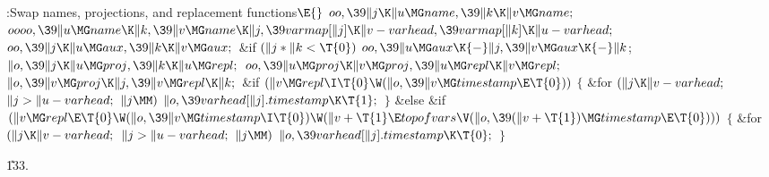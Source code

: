 \Y\B\4:Swap names, projections, and replacement functions\X${}\E{}$\6
$\\{oo},\39\|j\K\|u\MG\\{name},\39\|k\K\|v\MG\\{name};{}$\6
${}\\{oooo},\39\|u\MG\\{name}\K\|k,\39\|v\MG\\{name}\K\|j,\39\\{varmap}[\|j]\K%
\|v-\\{varhead},\39\\{varmap}[\|k]\K\|u-\\{varhead};{}$\6
${}\\{oo},\39\|j\K\|u\MG\\{aux},\39\|k\K\|v\MG\\{aux};{}$\6
\&{if} ${}(\|j*\|k<\T{0}){}$\1\5
${}\\{oo},\39\|u\MG\\{aux}\K{-}\|j,\39\|v\MG\\{aux}\K{-}\|k{}$;\2\6
${}\|o,\39\|j\K\|u\MG\\{proj},\39\|k\K\|u\MG\\{repl};{}$\6
${}\\{oo},\39\|u\MG\\{proj}\K\|v\MG\\{proj},\39\|u\MG\\{repl}\K\|v\MG%
\\{repl};{}$\6
${}\|o,\39\|v\MG\\{proj}\K\|j,\39\|v\MG\\{repl}\K\|k;{}$\6
\&{if} ${}(\|v\MG\\{repl}\I\T{0}\W(\|o,\39\|v\MG\\{timestamp}\E\T{0})){}$\5
${}\{{}$\1\6
\&{for} ${}(\|j\K\|v-\\{varhead};{}$ ${}\|j>\|u-\\{varhead};{}$ ${}\|j\MM){}$\1%
\5
${}\|o,\39\\{varhead}[\|j].\\{timestamp}\K\T{1};{}$\2\6
\4${}\}{}$\5
\2\&{else} \&{if} ${}(\|v\MG\\{repl}\E\T{0}\W(\|o,\39\|v\MG\\{timestamp}\I%
\T{0})\W(\|v+\T{1}\E\\{topofvars}\V(\|o,\39(\|v+\T{1})\MG\\{timestamp}\E%
\T{0}))){}$\5
${}\{{}$\1\6
\&{for} ${}(\|j\K\|v-\\{varhead};{}$ ${}\|j>\|u-\\{varhead};{}$ ${}\|j\MM){}$\1%
\5
${}\|o,\39\\{varhead}[\|j].\\{timestamp}\K\T{0};{}$\2\6
\4${}\}{}$\2\par
\U133.\fi

